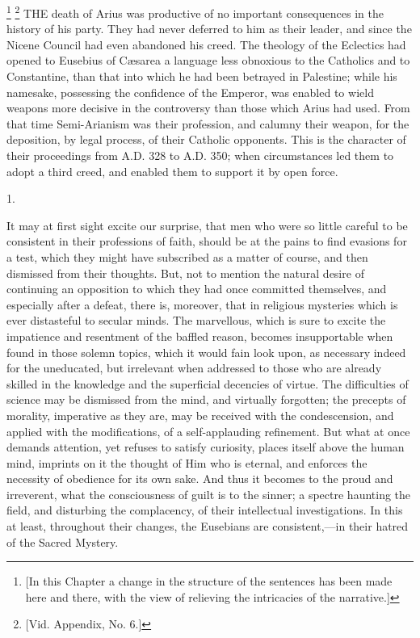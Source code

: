 

\footnote{[In this Chapter a change in the structure of the sentences has
been made here and there, with the view of relieving the intricacies
of the narrative.]} \footnote{[Vid. Appendix, No. 6.]} THE death of Arius was productive of no
important consequences in the history of his party. They had never
deferred to him as their leader, and since the Nicene Council had even
abandoned his creed. The theology of the Eclectics had opened to
Eusebius of Cæsarea a language less obnoxious to the Catholics and to
Constantine, than that into which he had been betrayed in Palestine;
while his namesake, possessing the confidence of the Emperor, was
enabled to wield weapons more decisive in the controversy than those
which Arius had used. From that time Semi-Arianism was their
profession, and calumny their weapon, for the deposition, by legal
process, of their Catholic opponents. This is the character of their
proceedings from A.D. 328 to A.D.
350; when circumstances led them to adopt a third creed, and enabled
them to support it by open force.

1.

It may at first sight excite our surprise, that men who were so
little careful to be consistent in their professions of faith, should
be at the pains to find evasions for a test, which they might have
subscribed as a matter of course, and then dismissed from their
thoughts. But, not to mention the natural desire of continuing an
opposition to which they had once committed themselves, and especially
after a defeat, there is, moreover, that in religious mysteries which
is ever distasteful to secular minds. The marvellous, which is sure to
excite the impatience and resentment of the baffled reason, becomes
insupportable when found in those solemn topics, which it would fain
look upon, as necessary indeed for the uneducated, but irrelevant when
addressed to those who are already skilled in the knowledge and the
superficial decencies of virtue. The difficulties of science may be
dismissed from the mind, and virtually forgotten; the precepts of
morality, imperative as they are, may be received with the
condescension, and applied with the modifications, of a
self-applauding refinement. But what at once demands attention, yet
refuses to satisfy curiosity, places itself above the human mind,
imprints on it the thought of Him who is eternal, and enforces the
necessity of obedience for its own sake. And thus it becomes to the
proud and irreverent, what the consciousness of guilt is to the
sinner; a spectre haunting the field, and disturbing the complacency,
of their intellectual investigations. In this at least, throughout
their changes, the Eusebians are consistent,—in their hatred of the
Sacred Mystery.

